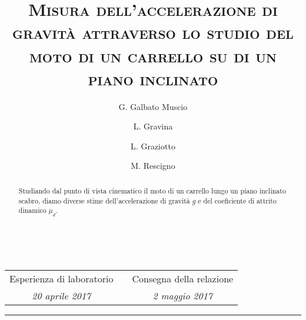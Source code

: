 \documentclass[10pt,oneside,a4paper]{article}
\title{\textsc{Misura dell'accelerazione di gravità attraverso lo studio del moto di un carrello su di un piano inclinato }}
\author{\small{G. Galbato Muscio} \and \small{L. Gravina} \and \small{L. Graziotto} \and \small{M. Rescigno}}
\date{}
\begin{document}
	\maketitle
	\begin{center} 
		 \\
		\vspace{1cm}
		\begin{tabular}{ccc}
			Esperienza di laboratorio && Consegna della relazione \\
			\emph{\small{20 aprile 2017}} && \emph{\small{2 maggio 2017}} \\
		\end{tabular} 
		
		\vspace{0.5cm}
		
	\end{center}
\hrule
\vspace{0.5cm}
\begin{abstract}
	Studiando dal punto di vista cinematico il moto di un carrello lungo un piano inclinato scabro, diamo diverse stime dell'accelerazione di gravità $g$ e del coeficiente di attrito dinamico $\mu_d$.
\end{abstract}
\newpage
\tableofcontents %
\listoftables %
\listoffigures %
\pagebreak
\end{document}
